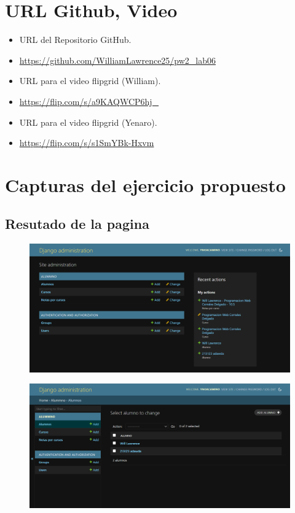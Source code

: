 \documentclass{article}
\begin{document}
	\section{URL Github, Video}
	\begin{itemize}
		\item URL del Repositorio GitHub.
		\item \url{https://github.com/WilliamLawrence25/pw2_lab06}
		\item URL para el video flipgrid (William).
		\item \url{https://flip.com/s/a9KAQWCP6hj_}	
		\item URL para el video flipgrid (Yenaro).
		\item \url{https://flip.com/s/s1SmYBk-Hxvm}	
	
	\end{itemize}
	\clearpage	
	
	\section{Capturas del ejercicio propuesto}
	
	\subsection{Resutado de la pagina}
	\begin{figure}[H]
		\centering
		\includegraphics[width=1.0\textwidth, keepaspectratio]{img/pagina1}
	\end{figure}
	
	\begin{figure}[H]
		\centering
		\includegraphics[width=1.0\textwidth, keepaspectratio]{img/pagina2}
	\end{figure}
	
\end{document}
